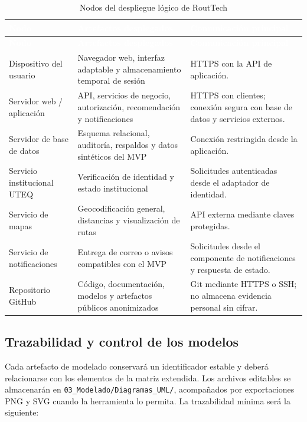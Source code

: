 \documentclass[12pt,a4paper]{article}
\begin{document}
\begin{longtable}{L{3.30cm} L{4.10cm} L{5.70cm}}
\caption{Nodos del despliegue lógico de RoutTech}\label{tab:nodos-despliegue}\\
\textcolor{white}{\textbf{Nodo}} &
\textcolor{white}{\textbf{Artefactos desplegados}} &
\textcolor{white}{\textbf{Comunicación principal}}\\
\endfirsthead
{}
\textcolor{white}{\textbf{Nodo}} &
\textcolor{white}{\textbf{Artefactos desplegados}} &
\textcolor{white}{\textbf{Comunicación principal}}\\
\endhead
Dispositivo del usuario & Navegador web, interfaz adaptable y almacenamiento temporal de sesión & HTTPS con la API de aplicación.\\
Servidor web / aplicación & API, servicios de negocio, autorización, recomendación y notificaciones & HTTPS con clientes; conexión segura con base de datos y servicios externos.\\
Servidor de base de datos & Esquema relacional, auditoría, respaldos y datos sintéticos del MVP & Conexión restringida desde la aplicación.\\
Servicio institucional UTEQ & Verificación de identidad y estado institucional & Solicitudes autenticadas desde el adaptador de identidad.\\
Servicio de mapas & Geocodificación general, distancias y visualización de rutas & API externa mediante claves protegidas.\\
Servicio de notificaciones & Entrega de correo o avisos compatibles con el MVP & Solicitudes desde el componente de notificaciones y respuesta de estado.\\
Repositorio GitHub & Código, documentación, modelos y artefactos públicos anonimizados & Git mediante HTTPS o SSH; no almacena evidencia personal sin cifrar.\\
\end{longtable}

\subsection{Trazabilidad y control de los modelos}

Cada artefacto de modelado conservará un identificador estable y deberá relacionarse con los elementos de la matriz extendida. Los archivos editables se almacenarán en \nolinkurl{03_Modelado/Diagramas_UML/}, acompañados por exportaciones PNG y SVG cuando la herramienta lo permita. La trazabilidad mínima será la siguiente:
\end{document}
